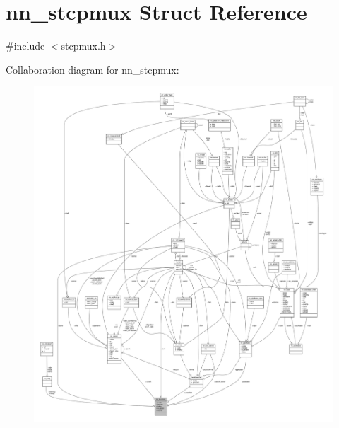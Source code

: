 \hypertarget{structnn__stcpmux}{}\section{nn\+\_\+stcpmux Struct Reference}
\label{structnn__stcpmux}


{\ttfamily \#include $<$stcpmux.\+h$>$}



Collaboration diagram for nn\+\_\+stcpmux\+:\nopagebreak
\begin{figure}[H]
\begin{center}
\leavevmode
\includegraphics[width=350pt]{structnn__stcpmux__coll__graph}
\end{center}
\end{figure}

